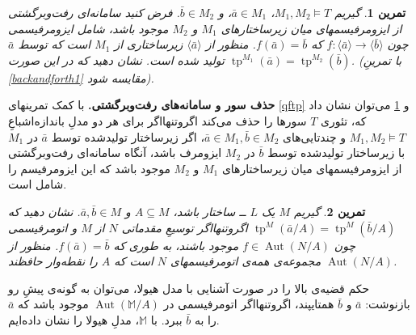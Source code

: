 \documentclass[12pt,a4paper]{report}
\theoremstyle{colorhead}
\newtheorem{tam}{تمرین}
\DeclareMathOperator{\tp}{tp}
\DeclareMathOperator{\Aut}{Aut}
\begin{document}
\begin{tam}
\label{backandforth}
گیریم
$M_1,M_2\models T$،
$\bar{a}\in M_1$،
و
$\bar{b}\in M_2$.
فرض کنید سامانه‌ای رفت‌وبرگشتی از ایزومرفیسمهای میان زیرساختارهای
$M_1$
و
$M_2$
موجود باشد، شامل ایزومرفیسمی چون
\mbox{$f:\langle \bar{a}\rangle \to \langle \bar{b}\rangle$}
که
$f(\bar{a})=\bar{b}$.
منظور از
$\langle \bar{a}\rangle$
زیرساختاری از
$M_1$
است که توسط
$\bar{a}$
تولید شده است. نشان دهید که در این صورت
$\tp^{M_1}(\bar{a})=\tp^{M_2}(\bar{b})$.
(با تمرینِ
\ref{backandforth1}
مقایسه شود).
\end{tam}
\begin{framed}
\textbf{حذف سور و سامانه‌های رفت‌وبرگشتی.}
با کمک تمرینهای
\ref{qftp}
و
\ref{backandforth}
 می‌توان نشان داد که، تئوری
$T$
سورها را حذف می‌کند اگروتنهااگر
برای هر دو مدلِ
باندازه‌اشباعِ
$M_1,M_2\models T$
و
چندتایی‌های
$\bar{a}\in M_1,\bar{b}\in M_2$،
اگر زیرساختار تولیدشده توسط
$\bar{a}$
در
$M_1$
با زیرساختار تولیدشده توسط
$\bar{b}$
در
$M_2$
ایزومرف باشد، آنگاه سامانه‌ای رفت‌وبرگشتی از ایزومرفیسمهای
میان زیرساختارهای
$M_1$
و
$M_2$
موجود باشد که این ایزومرفیسم را شامل است.
\end{framed}
\begin{tam}
\label{automorphism}
گیریم
$M$
یک
$L$ ــ
ساختار باشد،
$A\subseteq M$
و
$\bar{a},\bar{b}\in M$.
نشان دهید که
$\tp^M(\bar{a}/A)=\tp^M(\bar{b}/A)$
اگروتنهااگر توسیعِ مقدماتی
$N$
از
$M$
و اتومرفیسمی چون
\mbox{$f\in \Aut(N/A)$}
موجود باشند، به طوری که
$f(\bar{a})=\bar{b}$.
منظور از
$\Aut(N/A)$
مجموعه‌ی همه‌ی اتومرفیسمهای
$N$
است که 
$A$
را نقطه‌وار حافظند.
\end{tam}
\begin{framed}
حکم قضیه‌ی بالا را در صورت آشنایی با مدل هیولا، می‌توان به گونه‌ی پیشِ رو بازنوشت:
$\bar{a}$
و
$\bar{b}$
همتایپند، اگروتنهااگر
اتومرفیسمی در
$\Aut(\mathbb{M}/A)$
موجود باشد که
$\bar{a}$
را به
$\bar{b}$
ببرد. با 
$\mathbb{M}$،
مدلِ هیولا را نشان داده‌ایم.
\end{framed}
\end{document}
